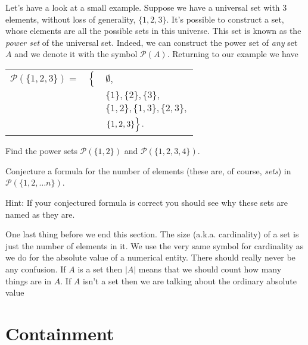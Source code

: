 Let's have a look at a small example.  Suppose we have a universal set
with 3 elements, without loss of generality, $\{1, 2, 3\}$.  It's 
possible to construct a set, whose elements are all the possible sets
in this universe.  This set is known as the 
\emph{power set} of the universal
set.  Indeed, we can construct the power set of \emph{any} set $A$ and
we denote it with the symbol ${\mathcal P}(A)$.  Returning to our
example we have 

\begin{center}
\begin{tabular}{rcl}
 ${\mathcal P}(\{1, 2, 3 \}) = $ & $\left\{ \rule{0pt}{10pt}  \right.$ & $\emptyset,$ \\
  & & $\{ 1 \},  \{ 2 \},  \{ 3 \},$ \\
  & & $\{ 1, 2 \},  \{ 1, 3 \},  \{ 2, 3 \},$ \\
  & & $\left.   \{ 1, 2, 3 \} \rule{0pt}{10pt} \right\}.$
\end{tabular}
\end{center}

\begin{exer} \rule{0pt}{0pt}

Find the power sets $ {\mathcal P}(\{1, 2 \})$ and 
${\mathcal P}(\{1, 2, 3, 4 \})$.  

Conjecture a formula for the number 
of elements (these are, of course, \emph{sets}) in 
${\mathcal P}(\{1, 2, \ldots n \})$.

Hint: If your conjectured formula is correct you should see 
why these sets are named as they are. 

\end{exer}

One last thing before we end this section.  The size (a.k.a. cardinality) of a set is just the number of elements in it.  We use the
very same symbol for cardinality as we do for the absolute value of a
numerical entity.  There should really never be any confusion.  If $A$ is
a set then $|A|$ means that we should count how many things are in $A$.
If $A$ isn't a set then we are talking about the ordinary absolute value

\clearpage 




\newpage

\section{Containment}

